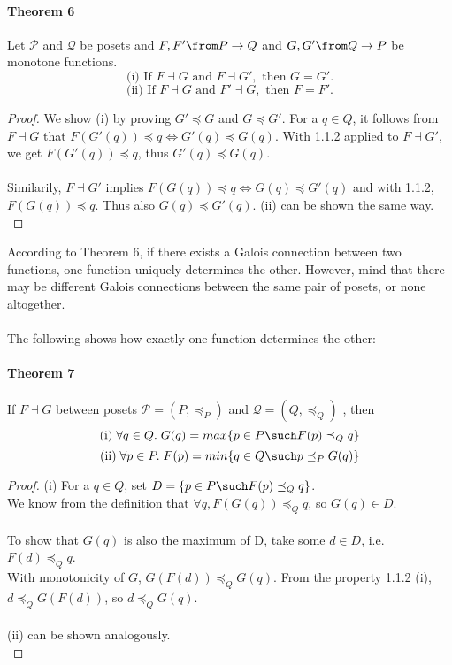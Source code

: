 \paragraph{Theorem 6}  
	Let $\mathcal P$ and $\mathcal Q$ be posets and  $F,F' \from P \to Q$ and $G,G' \from Q \to P$ be monotone functions.
\[\text{(i) If } F \dashv G \text{ and }F \dashv G',\text{ then } G = G'. \]
\[\text{(ii) If } F \dashv G \text{ and }F' \dashv G,\text{ then } F = F'. \]
\begin{proof}
	We show (i) by proving $G' \preceq G$ and $G \preceq G'$.
	For a $q \in Q$, it follows from $F \dashv G$ that $F(G'(q)) \preceq q \Leftrightarrow G'(q) \preceq G(q)$. With 1.1.2 applied to  $F \dashv G'$, we get $F(G'(q)) \preceq q$, thus $G'(q) \preceq G(q)$.\\\\ Similarily, $F \dashv G'$ implies $F(G(q)) \preceq q \Leftrightarrow G(q) \preceq G'(q)$ and with 1.1.2, $F(G(q)) \preceq q$. Thus also $G(q) \preceq G'(q)$. (ii) can be shown the same way.\\
\end{proof}

\vspace{\baselineskip}
	According to Theorem 6, if there exists a Galois connection between two functions, one function uniquely determines the other. However, mind that there may be different Galois connections between the same pair of posets, or none altogether.\\\\
	The following shows how exactly one function determines the other: \\
\paragraph{Theorem 7} 
	 If $F \dashv G$ between  posets $\mathcal{P} = (P, \preceq_P)$ and  $\mathcal{Q} = (Q, \preceq_Q)$ , then
\[\text{(i)}\; \forall q \in Q.\; G(q) = max\{p \in P \such F(p) \preceq_Q q\} \]
\[\text{(ii)}\;  \forall p \in P.\; F(p) = min\{q \in Q \such p \preceq_P G(q)\} \]
\begin{proof}
 	(i) For a $q \in Q$, set $D = \{p \in P \such F(p) \preceq_Q q\}$. 
	\\We know from the definition that $\forall q, F(G(q)) \preceq_Q q$, so $G(q) \in D$.
	\\\\To show that $G(q)$ is also the maximum of D, take some $d \in D$, i.e. $F(d) \preceq_Q q$. 
	\\With monotonicity of $G$, $G(F(d)) \preceq_Q G(q)$. From the property 1.1.2 (i), $d \preceq_Q G(F(d))$, so $d \preceq_Q G(q)$.
	\\\\ (ii) can be shown analogously.\\
\end{proof}
\vspace{\baselineskip}\vspace{\baselineskip}\newpage
